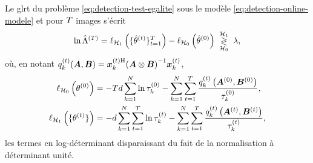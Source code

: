 \begin{proposition}
\label{prop:detection-online-glrt}
  Le glrt du problème \cref{eq:detection-test-egalite} sous le modèle \cref{eq:detection-online-modele} et pour $T$ images s'écrit
  \begin{equation}
    \ln\hat{\Lambda}^{(T)}
    =
    \ell_{\mathcal{H}_1}\left(\{\hat{\theta}^{(t)}\}_{t=1}^{T}\right)
    - \ell_{\mathcal{H}_0}\left(\hat{\theta}^{(0)}\right)
    \;\underset{\mathcal{H}_0}{\overset{\mathcal{H}_1}{\gtrless}}\; \lambda,
    \label{eq:detection-online-glrt}
  \end{equation}
  où, en notant $q_k^{(t)}(\boldsymbol{A},\boldsymbol{B}) = \boldsymbol{x}_k^{(t)\mathrm{H}}{(\boldsymbol{A}\otimes\boldsymbol{B})}^{-1}\boldsymbol{x}_k^{(t)}$,
  \begin{equation}
    \begin{aligned}
      \ell_{\mathcal{H}_0}\left(\theta^{(0)}\right)
      &= -Td\sum_{k=1}^{N}\ln\tau_k^{(0)}
         - \sum_{k=1}^{N}\sum_{t=1}^{T}
           \frac{q_k^{(t)}\left(\boldsymbol{A}^{(0)},\boldsymbol{B}^{(0)}\right)}{\tau_k^{(0)}},
      \\
      \ell_{\mathcal{H}_1}\left(\{\theta^{(t)}\}\right)
      &= -d\sum_{k=1}^{N}\sum_{t=1}^{T}\ln\tau_k^{(t)}
         - \sum_{k=1}^{N}\sum_{t=1}^{T}
           \frac{q_k^{(t)}\left(\boldsymbol{A}^{(t)},\boldsymbol{B}^{(t)}\right)}{\tau_k^{(t)}},
    \end{aligned}
    \label{eq:detection-online-vraisemblances}
  \end{equation}
  les termes en log-déterminant disparaissant du fait de la normalisation à déterminant unité.
\end{proposition}

